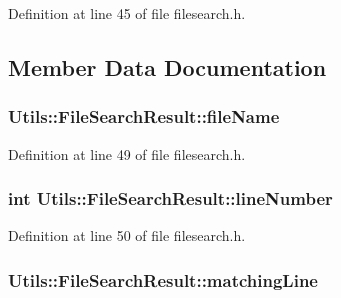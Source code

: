 \-Definition at line 45 of file filesearch.\-h.



\subsection{\-Member \-Data \-Documentation}
\hypertarget{class_utils_1_1_file_search_result_a6768edb856c8a6055d2e3e04dc94a969}{
\subsubsection[{file\-Name}]{ {\bf \-Utils\-::\-File\-Search\-Result\-::file\-Name}}}\label{class_utils_1_1_file_search_result_a6768edb856c8a6055d2e3e04dc94a969}


\-Definition at line 49 of file filesearch.\-h.

\hypertarget{class_utils_1_1_file_search_result_a5bd90f47d915c5af4af62bed46abe7c2}{
\subsubsection[{line\-Number}]{\setlength{\rightskip}{0pt plus 5cm}int {\bf \-Utils\-::\-File\-Search\-Result\-::line\-Number}}}\label{class_utils_1_1_file_search_result_a5bd90f47d915c5af4af62bed46abe7c2}


\-Definition at line 50 of file filesearch.\-h.

\hypertarget{class_utils_1_1_file_search_result_a9fb2f9e0118742e307425f781375e572}{
\subsubsection[{matching\-Line}]{ {\bf \-Utils\-::\-File\-Search\-Result\-::matching\-Line}}}\label{class_utils_1_1_file_search_result_a9fb2f9e0118742e307425f781375e572}


